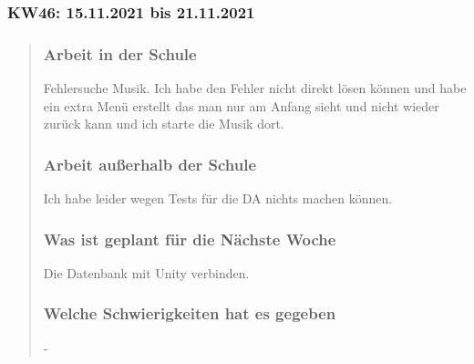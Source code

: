 
\subsubsection{KW46: 15.11.2021 bis 21.11.2021}
\begin{quote}
	\subsubsection*{Arbeit in der Schule}
	Fehlersuche Musik. Ich habe den Fehler nicht direkt lösen können und habe ein extra Menü erstellt das man nur am Anfang sieht und nicht wieder zurück kann und ich starte die Musik dort. 
	\subsubsection*{Arbeit außerhalb der Schule}
	Ich habe leider wegen Tests für die DA nichts machen können.
	
	\subsubsection*{Was ist geplant für die Nächste Woche}
	Die Datenbank mit Unity verbinden.
	
	\subsubsection*{Welche Schwierigkeiten hat es gegeben}
	-
	
\end{quote}
